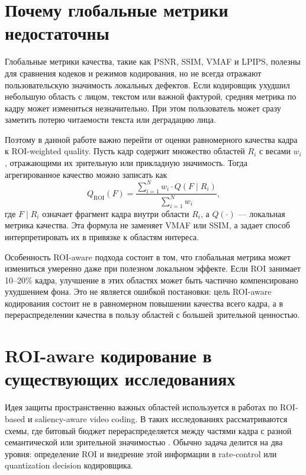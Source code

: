 \documentclass[12pt,a4paper,oneside,openany]{report}
\newcommand{\roi}{\mathrm{ROI}}
\begin{document}

\section{Почему глобальные метрики недостаточны}

Глобальные метрики качества, такие как PSNR, SSIM, VMAF и LPIPS, полезны для сравнения кодеков и
режимов кодирования, но не всегда отражают пользовательскую значимость локальных дефектов. Если
кодировщик ухудшил небольшую область с лицом, текстом или важной фактурой, средняя метрика по
кадру может измениться незначительно. При этом пользователь может сразу заметить потерю
читаемости текста или деградацию лица.

Поэтому в данной работе важно перейти от оценки равномерного качества кадра к ROI-weighted
quality. Пусть кадр содержит множество областей $R_i$ с весами $w_i$, отражающими их зрительную
или прикладную значимость. Тогда агрегированное качество можно записать как
\begin{equation}
  Q_{\roi}(F) =\frac{\sum_{i=1}^{N} w_i \cdot Q(F\mid R_i)}{\sum_{i=1}^{N} w_i},
  \label{eq:roi_quality}
\end{equation}
где $F\mid R_i$ означает фрагмент кадра внутри области $R_i$, а $Q(\cdot)$ --- локальная метрика
качества. Эта формула не заменяет VMAF или SSIM, а задает способ интерпретировать их в привязке
к областям интереса.

Особенность ROI-aware подхода состоит в том, что глобальная метрика может измениться умеренно
даже при полезном локальном эффекте. Если ROI занимает 10--20\% кадра, улучшение в этих областях
может быть частично компенсировано ухудшением фона. Это не является ошибкой постановки: цель
ROI-aware кодирования состоит не в равномерном повышении качества всего кадра, а в
перераспределении качества в пользу областей с большей зрительной ценностью.


\section{ROI-aware кодирование в существующих исследованиях}

Идея защиты пространственно важных областей используется в работах по ROI-based и saliency-aware
video coding. В таких исследованиях рассматриваются схемы, где битовый бюджет перераспределяется
между частями кадра с разной семантической или зрительной значимостью
\cite{roi_live_videos,roi_h264_transcoding,roi_hevc_rate_control,saliency_video}. Обычно задача
делится на два уровня: определение ROI и внедрение этой информации в rate-control или
quantization decision кодировщика.
\end{document}
